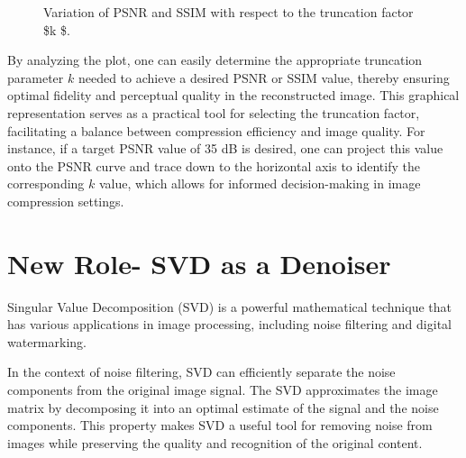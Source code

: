 \documentclass[
  journal,
]{IEEEtran}%
\begin{document}
\begin{figure}


\caption{\label{fig-psnr_ssim_variation_plot}Variation of PSNR and SSIM
with respect to the truncation factor \$k \$.}

\end{figure}%

By analyzing the plot, one can easily determine the appropriate
truncation parameter \(k\) needed to achieve a desired PSNR or SSIM
value, thereby ensuring optimal fidelity and perceptual quality in the
reconstructed image. This graphical representation serves as a practical
tool for selecting the truncation factor, facilitating a balance between
compression efficiency and image quality. For instance, if a target PSNR
value of 35 dB is desired, one can project this value onto the PSNR
curve and trace down to the horizontal axis to identify the
corresponding \(k\) value, which allows for informed decision-making in
image compression settings.

\section{New Role- SVD as a Denoiser}\label{new-role--svd-as-a-denoiser}

Singular Value Decomposition (SVD) is a powerful mathematical technique
that has various applications in image processing, including noise
filtering and digital watermarking.

In the context of noise filtering, SVD can efficiently separate the
noise components from the original image signal. The SVD approximates
the image matrix by decomposing it into an optimal estimate of the
signal and the noise components. This property makes SVD a useful tool
for removing noise from images while preserving the quality and
recognition of the original content.
\end{document}
